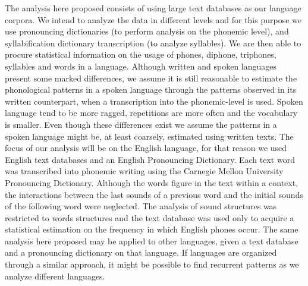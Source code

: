 The analysis here proposed consists of using large text databases 
as our language corpora. We intend to analyze the data in different levels
and for this purpose we use pronouncing dictionaries (to perform analysis on the phonemic level),
and syllabification dictionary transcription (to analyze syllables).
We are then able to procure statistical information on the usage of phones,
diphone, triphones, syllables and words in a language.
Although written and spoken languages present some marked differences, we assume 
it is still reasonable
to estimate the phonological patterns in a spoken language through  %
the patterns observed in its written counterpart, when a transcription into the phonemic-level is used.
Spoken language tend to be more ragged, repetitions are more often and the vocabulary
is smaller. Even though these differences exist
we assume the patterns in a spoken language might be, at least coarsely, estimated using written texts.
The focus of our analysis will be on the English language, for that reason we used English text databases
and an English Pronouncing Dictionary. Each text word was transcribed into phonemic 
writing using the Carnegie Mellon University Pronouncing Dictionary. 
Although the words figure in the text within a context, the interactions between the last sounds of a previous word 
and the initial sounds of the following word were neglected.
The analysis of sound structures was restricted to words structures and the text database was used only 
to acquire a statistical estimation on the frequency in which English phones occur.  
The same analysis here proposed may be applied to other languages, 
given a text database and a pronouncing dictionary on that language.
If languages are organized through a similar approach, it might be possible to find recurrent patterns 
as we analyze different languages. 


